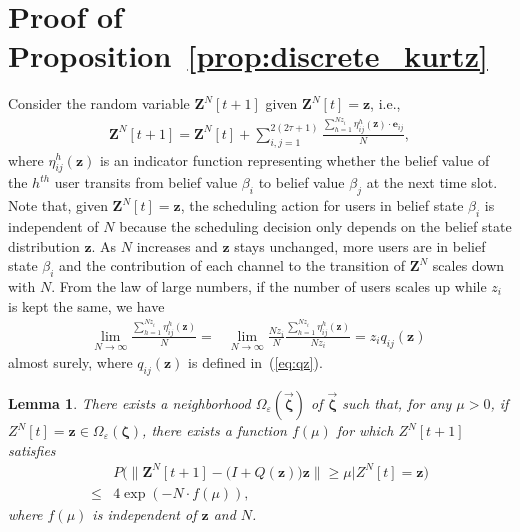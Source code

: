\documentclass[11pt,twocolumn]{IEEEtran}
\newtheorem{lemma}{Lemma}
\begin{document}
\section{Proof of Proposition~\ref{prop:discrete_kurtz}}
\label{appen:discrete_kurtz}
Consider the random variable $\bm Z^{N}[t+1]$ given $\bm Z^{N}[t]=\bm z$, i.e.,
\begin{align}
\bm Z^{N}[t+1]{=}\bm Z^{N}[t]+\sum_{i,j=1}^{2(2\tau+1)} \frac{\sum_{h=1}^{N z_i} \eta^h_{ij}(\bm z) {\cdot} \bm e_{ij}}{N}, \label{eq:drift_t}
\end{align}
where $\eta^h_{ij}(\bm z)$ is an indicator function representing whether the belief value of the $h^{th}$ user transits from belief value $\beta_i$ to belief value $\beta_j$ at the next time slot. Note that, given $\bm Z^{N}[t]=\bm z$, the scheduling action for users in belief state $\beta_i$ is independent of $N$ because the scheduling decision only depends on the belief state distribution $\bm z$. As $N$ increases and $\bm z$ stays unchanged, more users are in belief state $\beta_i$ and the contribution of each channel to the transition of $\bm Z^{N}$ scales down with $N$. From the law of large numbers, if the number of users scales up while $z_i$ is kept the same, we have
\begin{align}
\lim_{N \rightarrow \infty} \frac{\sum_{h=1}^{N z_i} \eta^h_{ij}(\bm z)}{N}{=}&\lim_{N \rightarrow \infty} \frac{N z_i}{N} \frac{\sum_{h=1}^{N z_i} \eta^h_{ij}(\bm z)}{N z_i}{=}z_i q_{ij}(\bm z)\nonumber\
\end{align}
almost surely, where $q_{ij}(\bm z)$ is defined in~(\ref{eq:qz}).

\begin{lemma}
\label{lemma:onestep}
There exists a neighborhood $\Omega_{\varepsilon}(\vec{\bm \zeta})$ of $\vec{\bm \zeta}$ such that, for any $\mu>0$, if $Z^{N}[t]=\bm z \in \Omega_{\varepsilon}(\bm \zeta)$, there exists a function $f(\mu)$ for which $Z^{N}[t+1]$ satisfies
\begin{align}
&P\Big( \big\| \bm Z^{N}[t+1]-\big(I+Q(\bm z)\big)\bm z \big\| \geq \mu \Big| Z^{N}[t]=\bm z \Big)\nonumber\\
\leq& 4 \exp(-N \cdot f(\mu)), \nonumber
\end{align}
where $f(\mu)$ is independent of $\bm z$ and $N$.
\end{lemma}
\end{document}
